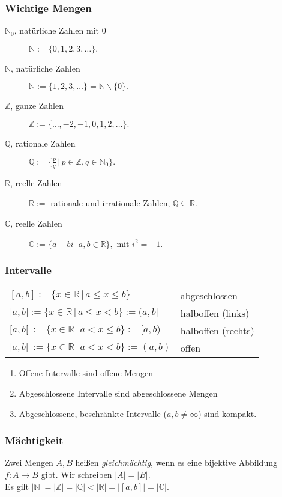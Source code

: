 \documentclass[a4paper, 9pt, DIV=24]{scrartcl}
\newcommand{\N}{\mathbb{N}}
\begin{document}
\subsubsection{Wichtige Mengen}
\begin{description}
 \item[$\N_0$, natürliche Zahlen mit 0] $\N := \{0,1,2,3,\dots\}.$
 \item[$\N$, natürliche Zahlen] $\N := \{1,2,3,\dots\} = \N\backslash\{0\}.$
 \item[$\mathbb{Z}$, ganze Zahlen] $\mathbb{Z} := \{\dots,-2,-1,0,1,2,\dots\}.$
 \item[$\mathbb{Q}$, rationale Zahlen] $\mathbb{Q} := \{\frac{p}{q}\, |\, p \in \mathbb{Z}, q \in \N_0\}.$
 \item[$\mathbb{R}$, reelle Zahlen] $\mathbb{R} := $ rationale und irrationale Zahlen, $\mathbb{Q} \subseteq \mathbb{R}$.
 \item[$\mathbb{C}$, reelle Zahlen] $\mathbb{C} := \{a - bi\, |\, a, b \in \mathbb{R}\}, $ mit $i^2 = -1$.
\end{description}
\subsubsection{Intervalle}
\begin{tabular}{ll}
$[a,b] := \{x\in\mathbb{R}\, |\, a \leq x \leq b\}$ & abgeschlossen \\
$]a,b] := \{x\in\mathbb{R}\, |\, a \leq x < b\} := (a,b]$ & halboffen (links) \\
$[a,b[\ := \{x\in\mathbb{R}\, |\, a < x \leq b\} := [a,b)$ & halboffen (rechts) \\
$]a,b[\ := \{x\in\mathbb{R}\, |\, a < x < b\} := (a,b)$ & offen \\
\end{tabular}
\begin{enumerate}[label={(}\arabic*{)}]
 \item Offene Intervalle sind offene Mengen
 \item Abgeschlossene Intervalle sind abgeschlossene Mengen
 \item Abgeschlossene, beschränkte Intervalle ($a,b \neq \infty$) sind kompakt.
\end{enumerate}
\subsubsection{Mächtigkeit}
Zwei Mengen $A, B$ heißen \emph{gleichmächtig}, wenn es eine bijektive Abbildung $f: A \rightarrow B$ gibt.
Wir schreiben $|A| = |B|$. \\
Es gilt $|\N| = |\mathbb{Z}| = |\mathbb{Q}| < |\mathbb{R}| = |[a,b]| = |\mathbb{C}|$.
\end{document}
